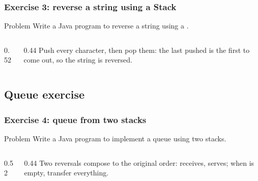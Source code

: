 \documentclass[aspectratio=169,10pt, compress]{beamer}
\begin{document}
\begin{frame}[t,fragile] \frametitle{Exercise 3: reverse a string using a Stack}
  \begin{block}{Problem}
    Write a Java program to reverse a string using a .
  \end{block}
  \begin{columns}[T]
    \begin{column}{0.52\textwidth}
    \end{column}
    \begin{column}{0.44\textwidth}
      \small
      Push every character, then pop them: the last pushed is the
      first to come out, so the string is reversed.
    \end{column}
  \end{columns}
\end{frame}

\subsection[Queue]{Queue exercise}




\begin{frame}[t,fragile] \frametitle{Exercise 4: queue from two stacks}
  \begin{block}{Problem}
    Write a Java program to implement a queue using two stacks.
  \end{block}
  \begin{columns}[T]
    \begin{column}{0.52\textwidth}
    \end{column}
    \begin{column}{0.44\textwidth}
      \small
      Two reversals compose to the original order: 
      receives,  serves; when  is empty,
      transfer everything.
    \end{column}
  \end{columns}
\end{frame}
\end{document}
